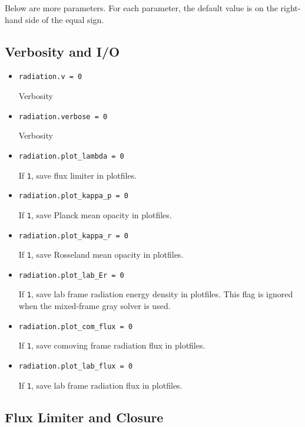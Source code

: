 \documentclass[11pt,letterpaper]{article}
\begin{document}
Below are more parameters.  For each parameter, the default value is
on the right-hand side of the equal sign.


\subsection{Verbosity and I/O}
\label{sec:bothpar}

\begin{itemize}
\item {\tt radiation.v = 0}
  
  Verbosity

\item {\tt radiation.verbose = 0}
  
  Verbosity

\item {\tt radiation.plot\_lambda = 0}
  
  If {\tt 1}, save flux limiter in plotfiles.

\item {\tt radiation.plot\_kappa\_p = 0}

  If {\tt 1}, save Planck mean opacity in plotfiles.

\item {\tt radiation.plot\_kappa\_r = 0}

  If {\tt 1}, save Rosseland mean opacity in plotfiles.

\item {\tt radiation.plot\_lab\_Er = 0}
  
  If {\tt 1}, save lab frame radiation energy density in plotfiles.
  This flag is ignored when the mixed-frame gray solver is used.

\item {\tt radiation.plot\_com\_flux = 0}
  
  If {\tt 1}, save comoving frame radiation flux in plotfiles.

\item {\tt radiation.plot\_lab\_flux = 0}

  If {\tt 1}, save lab frame radiation flux in plotfiles.

\end{itemize}


\subsection{Flux Limiter and Closure}

\label{sec:fluxlimiter}
\end{document}
